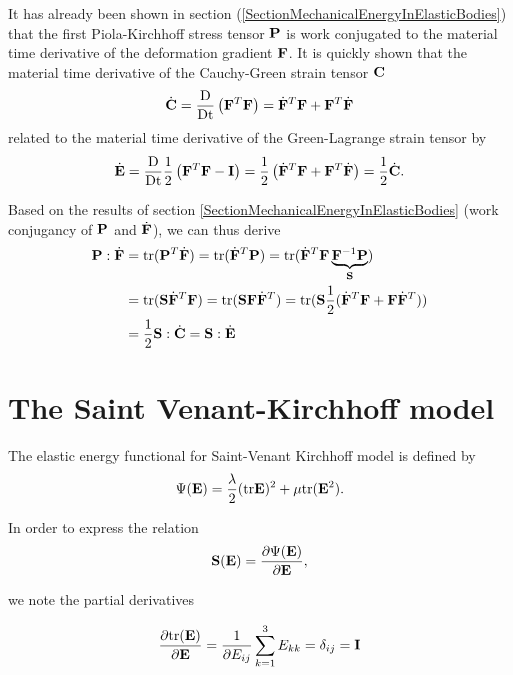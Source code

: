 It has already been shown in section (\ref{SectionMechanicalEnergyInElasticBodies}) that the first Piola-Kirchhoff stress tensor $\mathbf {P} $ is work conjugated to the material time derivative of the deformation gradient $\mathbf {F }$. It is quickly shown that the material time derivative of the Cauchy-Green strain tensor $\mathbf {C} $
\begin{alignat}{1}
\dot {\mathbf {C} } =  \frac{\textnormal{D}}{\textnormal{Dt}} \left( \mathbf {F } ^T \mathbf {F } \right) = \dot{\mathbf {F }}  ^T \mathbf {F } + \mathbf {F } ^T \dot{\mathbf {F }} 
\end{alignat}
related to the material time derivative of the Green-Lagrange strain tensor by
\begin{alignat}{1}
\dot {\mathbf {E} } =  \frac{\textnormal{D}}{\textnormal{Dt}} \frac{1}{2} \left( \mathbf {F } ^T \mathbf {F }  -  \mathbf {I }\right) = \frac{1}{2} \left( \dot{\mathbf {F }}  ^T \mathbf {F } + \mathbf {F } ^T \dot{\mathbf {F }}  \right) = \frac{1}{2} \dot {\mathbf {C} }.
\end{alignat}

Based on the results of section \ref{SectionMechanicalEnergyInElasticBodies} (work conjugancy of $\mathbf {P} $ and $\dot{\mathbf {F }} $), we can thus derive 
\begin{alignat}{1}
\mathbf {P}  : \dot{\mathbf {F }}   &= \textnormal{tr} (\mathbf {P}  ^T \dot{\mathbf {F }} ) = \textnormal{tr} (\dot{\mathbf {F }}  ^T \mathbf {P} ) = \textnormal{tr} (\dot{\mathbf {F }}  ^T \mathbf {F } \underbrace{ \mathbf {F } ^{-1} \mathbf {P} }_{\mathbf {S} }) \\
&= \textnormal{tr} (\mathbf {S}  \dot{\mathbf {F }} ^T \mathbf {F }) =  \textnormal{tr} (\mathbf {S}  \mathbf {F } \dot{\mathbf {F }} ^T ) = \textnormal{tr} (\mathbf {S}  \frac{1}{2}(\dot{\mathbf {F }} ^T \mathbf {F } +  \mathbf {F } \dot{\mathbf {F }} ^T )) \\
&= \frac{1}{2} \mathbf {S} : \dot{\mathbf {C} } = \mathbf {S} : \dot{\mathbf {E} }
\end{alignat}

\section{The Saint Venant-Kirchhoff model} 
\label{ASVKModel}

The elastic energy functional for Saint-Venant Kirchhoff model is defined by
 \begin{equation}
 \Psi  (\mathbf {E}  )  = \frac{\lambda}{2} (\textnormal{tr}  \mathbf {E} )^2 + \mu \textnormal{tr}  (\mathbf {E} ^2).
\end{equation}

In order to express the relation 
 \begin{equation}
 \mathbf {S}  (\mathbf {E} ) = \frac{ \partial \Psi  (\mathbf {E}  )}{\partial \mathbf {E} },
\end{equation}

we note the partial derivatives 

 \begin{equation}
\frac{\partial \textnormal{tr}  (\mathbf {E} )}{\partial \mathbf {E} } = \frac{1}{\partial E_{ij}} \sum_{k=1} ^3 E_{kk} = \delta_{ij} =  \mathbf {I }
\end{equation}

